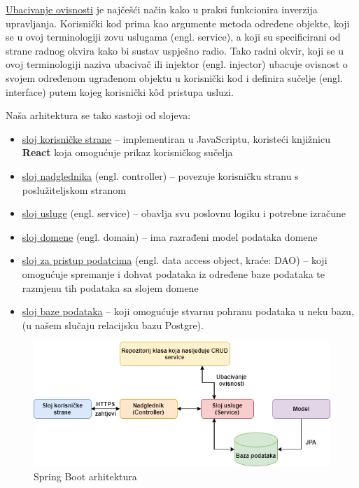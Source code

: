 	\underline{Ubacivanje ovisnosti} je najčešći način kako u praksi funkcionira inverzija upravljanja. Korisnički kod prima kao argumente metoda određene objekte, koji se u ovoj terminologiji zovu uslugama (engl. service), a koji su specificirani od strane radnog
	okvira kako bi sustav uspješno radio. Tako radni okvir, koji se u ovoj terminologiji
	naziva ubacivač ili injektor (engl. injector) ubacuje ovisnost o svojem određenom
	ugrađenom objektu u korisnički kod i definira sučelje (engl. interface) putem kojeg
	korisnički kôd pristupa usluzi. 
	
	\vspace{15pt} 
	
	Naša arhitektura se tako sastoji od slojeva:
	
	\begin{itemize}
		\item \underline{sloj korisničke strane} – implementiran u JavaScriptu, koristeći knjižnicu \textbf{React} koja omogućuje prikaz korisničkog sučelja
		\item \underline{sloj nadglednika} (engl. controller) – povezuje korisničku stranu s poslužiteljskom stranom
		\item \underline{sloj usluge} (engl. service) – obavlja svu poslovnu logiku i potrebne izračune
		\item \underline{sloj domene} (engl. domain) – ima razrađeni model podataka domene
		\item \underline{sloj za pristup podatcima} (engl. data access object, kraće: DAO) – koji
		omogućuje spremanje i dohvat podataka iz određene baze podataka te
		razmjenu tih podataka sa slojem domene
		\item \underline{sloj baze podataka} – koji omogućuje stvarnu pohranu podataka u neku bazu,(u našem slučaju relacijsku bazu Postgre). 
	\end{itemize} 

\vspace{15pt} 
\begin{figure}[H]
	\includegraphics[scale=0.75]{slike/arhitektura.PNG} %
	\centering
	\caption{Spring Boot arhitektura}
	\label{fig:spring}
\end{figure}

